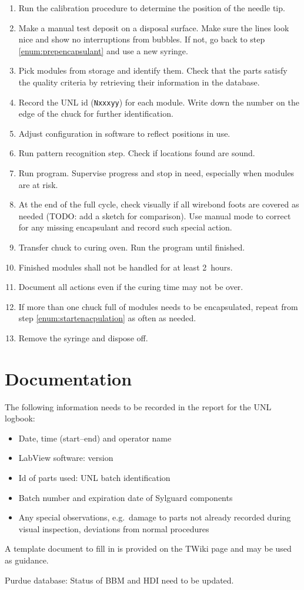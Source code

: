 \documentclass[12pt]{unlsilabsop}
\begin{document}
\begin{enumerate}
    \item Run the calibration procedure to determine the position of the needle tip.
    \item Make a manual test deposit on a disposal surface. Make sure the lines look nice and show no interruptions from bubbles. If not, go back to step \ref{enum:prepencapsulant} and use a new syringe.
    \item Pick modules from storage and identify them. Check that the parts satisfy the quality criteria by retrieving their information in the database. \label{enum:startenacpulation}
    \item Record the UNL id (\texttt{Nxxxyy}) for each module. Write down the number on the edge of the chuck for further identification.
    \item Adjust configuration in software to reflect positions in use.
    \item Run pattern recognition step. Check if locations found are sound.
    \item Run program. Supervise progress and stop in need, especially when modules are at risk.
    \item At the end of the full cycle, check visually if all wirebond foots are covered as needed (TODO: add a sketch for comparison). Use manual mode to correct for any missing encapsulant and record such special action.
    \item Transfer chuck to curing oven. Run the program until finished.
    \item Finished modules shall not be handled for at least 2~hours.
    \item Document all actions even if the curing time may not be over.
    \item If more than one chuck full of modules needs to be encapsulated, repeat from step \ref{enum:startenacpulation} as often as needed.
    \item Remove the syringe and dispose off.
\end{enumerate}

\section{Documentation}
The following information needs to be recorded in the report for the UNL logbook:
\begin{itemize}
    \item Date, time (start--end) and operator name
    \item LabView software: version
    \item Id of parts used: UNL batch identification
    \item Batch number and expiration date of Sylguard components
    \item Any special observations, e.g.~damage to parts not already recorded during visual inspection, deviations from normal procedures
\end{itemize}
A template document to fill in is provided on the TWiki page and may be used as guidance.

Purdue database: Status of BBM and HDI need to be updated.
\end{document}
